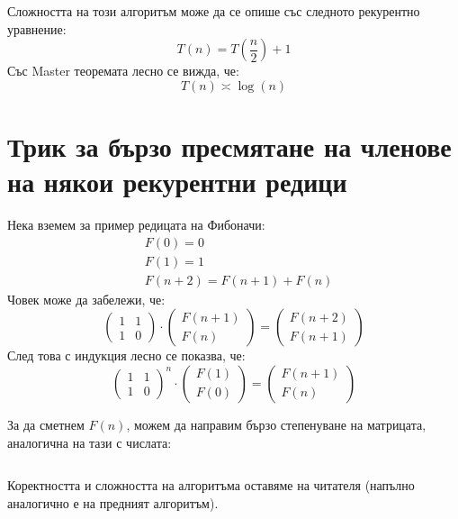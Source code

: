 \documentclass{article}
\theoremstyle{definition}
\theoremstyle{plain}
\theoremstyle{remark}
\theoremstyle{definition}
\begin{document}
Сложността на този алгоритъм може да се опише със следното рекурентно уравнение:
\[
    T(n) = T(\frac{n}{2}) + 1
\]
Със Master теоремата лесно се вижда, че:
\[
    T(n) \asymp \log(n)
\]

\pagebreak

\section*{Трик за бързо пресмятане на членове на някои рекурентни редици}

Нека вземем за пример редицата на Фибоначи:
\begin{align*}
     & F(0) = 0                   \\
     & F(1) = 1                   \\
     & F(n + 2) = F(n + 1) + F(n)
\end{align*}
Човек може да забележи, че:
\[
    \begin{pmatrix}
        1 & 1 \\
        1 & 0
    \end{pmatrix}
    \cdot
    \begin{pmatrix}
        F(n + 1) \\
        F(n)
    \end{pmatrix}
    =
    \begin{pmatrix}
        F(n + 2) \\
        F(n + 1)
    \end{pmatrix}
\]
След това с индукция лесно се показва, че:
\[
    \begin{pmatrix}
        1 & 1 \\
        1 & 0
    \end{pmatrix}^n
    \cdot
    \begin{pmatrix}
        F(1) \\
        F(0)
    \end{pmatrix}
    =
    \begin{pmatrix}
        F(n + 1) \\
        F(n)
    \end{pmatrix}
\]

За да сметнем $F(n)$, можем да направим бързо степенуване на матрицата, аналогична на тази с числата:
\inputminted[linenos]{c++}{algorithms/fibonacci.cpp}

Коректността и сложността на алгоритъма оставяме на читателя (напълно аналогично е на предният алгоритъм).

\pagebreak
\end{document}
